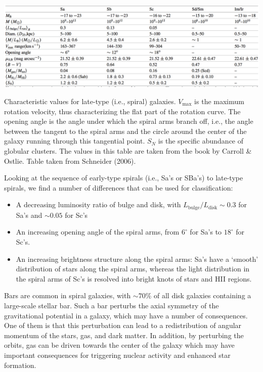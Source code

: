 \documentclass[a4paper,11pt]{article}
\begin{document}
\begin{table}[t]
    \centering
    \includegraphics[width=16cm]{figures/LateGalaxies.png}
    \caption{\footnotesize{Characteristic values for late-type (i.e., spiral) galaxies. $V_\mathrm{max}$ is the maximum rotation velocity, thus characterizing the flat part of the rotation curve. The opening angle is the angle under which the spiral arms branch off, i.e., the angle between the tangent to the spiral arms and the circle around the center of the galaxy running through this tangential point. $S_N$ is the specific abundance of globular clusters. The values in this table are taken from the book by Carroll \& Ostlie. Table taken from Schneider (2006).}}
    \label{table:lategalaxies}
\end{table}

{\noindent}Looking at the sequence of early-type spirals (i.e., Sa's or SBa's) to late-type spirals, we find a number of differences that can be used for classification:

\begin{itemize}
    \item A decreasing luminosity ratio of bulge and disk, with $L_\mathrm{bulge}/L_\mathrm{disk}\sim0.3$ for Sa’s and $\sim0.05$ for Sc’s
    \item An increasing opening angle of the spiral arms, from   $6^\circ$ for Sa's to $18^\circ$ for Sc's.
    \item An increasing brightness structure along the spiral arms: Sa's have a `smooth' distribution of stars along the spiral arms, whereas the light distribution in the spiral arms of Sc's is resolved into bright knots of stars and HII regions.
\end{itemize}

{\noindent}Bars are common in spiral galaxies, with $\sim70\%$ of all disk galaxies containing a large-scale stellar bar. Such a bar perturbs the axial symmetry of the gravitational potential in a galaxy, which may have a number of consequences. One of them is that this perturbation can lead to a redistribution of angular momentum of the stars, gas, and dark matter. In addition, by perturbing the orbits, gas can be driven towards the center of the galaxy which may have important consequences for triggering nuclear activity and enhanced star formation.
\end{document}
